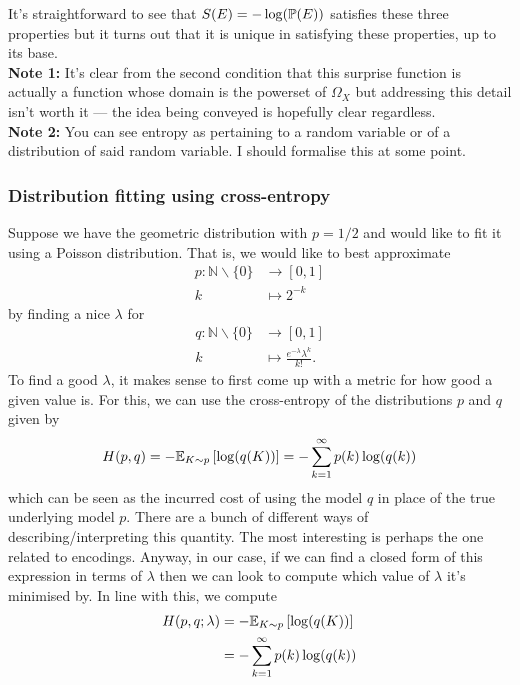 \documentclass[11pt]{article}
\begin{document}
\begin{appendices}
\noindent It's straightforward to see that $S(E)=-\log(\P(E))$ satisfies these three properties but it turns out that it is unique in satisfying these properties, up to its base.\\

\noindent\textbf{Note 1:} It's clear from the second condition that this surprise function is actually a function whose domain is the powerset of $\Omega_X$ but addressing this detail isn't worth it — the idea being conveyed is hopefully clear regardless.\\

\noindent\textbf{Note 2:} You can see entropy as pertaining to a random variable or of a distribution of said random variable. I should formalise this at some point.

\subsubsection{Distribution fitting using cross-entropy}
Suppose we have the geometric distribution with $p=1/2$ and would like to fit it using a Poisson distribution. That is, we would like to best approximate
\begin{align*}
    p:\mathbb{N}\backslash\{0\}&\to[0,1]\\
    k&\mapsto2^{-k}
\end{align*}
by finding a nice $\lambda$ for
\begin{align*}
    q:\mathbb{N}\backslash\{0\}&\to[0,1]\\
    k&\mapsto\frac{e^{-\lambda}\lambda^k}{k!}.
\end{align*}
To find a good $\lambda$, it makes sense to first come up with a metric for how good a given value is. For this, we can use the cross-entropy of the distributions $p$ and $q$ given by
$$
H(p,q)
=
-\E_{K\sim p}\left[\log(q(K))\right]
=
-\sum_{k=1}^{\infty}p(k)\log(q(k))
$$
which can be seen as the incurred cost of using the model $q$ in place of the true underlying model $p$. There are a bunch of different ways of describing/interpreting this quantity. The most interesting is perhaps the one related to encodings. Anyway, in our case, if we can find a closed form of this expression in terms of $\lambda$ then we can look to compute which value of $\lambda$ it's minimised by. In line with this, we compute
\begin{align*}
    H(p,q;\lambda)
    &=
    -\E_{K\sim p}\left[\log(q(K))\right]\\
    &=
    -\sum_{k=1}^{\infty}p(k)\log(q(k))\\

\end{align*}
\end{appendices}
\end{document}
